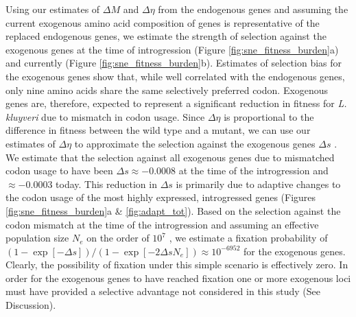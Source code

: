 \documentclass[doublespacing,linenumbers]{bmcart-modified}
\newcommand{\kluyveri}{\textit{L. kluyveri}\xspace}
\newcommand{\DE}{\ensuremath{{\Delta \eta}}\xspace}
\newcommand{\Ne}{\ensuremath{N_e}\xspace}
\newcommand{\GL}{\ensuremath{{\Delta s}}\xspace}
\begin{document}
Using our estimates of $\Delta M$ and $\Delta \eta$ from the endogenous genes and assuming the current exogenous amino acid composition of genes is representative of the replaced endogenous genes, we estimate the strength of selection against the exogenous genes at the time of introgression (Figure \ref{fig:sne_fitness_burden}a) and currently (Figure \ref{fig:sne_fitness_burden}b).
Estimates of selection bias for the exogenous genes show that, while well correlated with the endogenous genes, only nine amino acids share the same selectively preferred codon.
Exogenous genes are, therefore, expected to represent a significant reduction in fitness for \kluyveri due to mismatch in codon usage.
Since \DE is proportional to the difference in fitness between the wild type and a mutant, we can use our estimates of \DE to approximate the selection against the exogenous genes $\GL$ \citep{SellaAndHirsh2005,gilchrist2015}. 
We estimate that the selection against all exogenous genes due to mismatched codon usage to have been $\GL \approx -0.0008$ at the time of the introgression and $\approx -0.0003$ today.
This reduction in $\GL$ is primarily due to adaptive changes to the codon usage of the most highly expressed, introgressed genes (Figures \ref{fig:sne_fitness_burden}a \& \ref{fig:adapt_tot}).
Based on the selection against the codon mismatch at the time of the introgression and assuming an effective population size $\Ne$ on the order of $10^7$ \citep{wagner2005}, we estimate a fixation probability of $(1-\exp[-\GL])/(1-\exp[-2\GL \Ne]) \approx 10^{-6952}$ \citep{SellaAndHirsh2005} for the exogenous genes.
Clearly, the possibility of fixation under this simple scenario is effectively zero.
In order for the exogenous genes to have reached fixation one or more exogenous loci must have provided a selective advantage not considered in this study (See Discussion).
\end{document}
